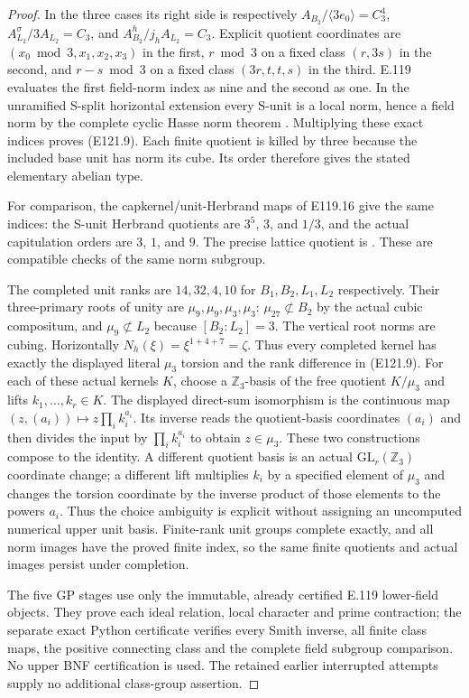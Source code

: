 \begin{proof}
In the three cases its right side is respectively
$A_{B_2}/\langle3e_0\rangle=C_3^4$,
$A_{L_2}^{\sigma}/3A_{L_2}=C_3$,
and $A_{B_2}^{h}/j_hA_{L_2}=C_3$.
Explicit quotient coordinates are
$(x_0\bmod3,x_1,x_2,x_3)$ in the first,
$r\bmod3$ on a fixed class $(r,3s)$ in the second, and
$r-s\bmod3$ on a fixed class $(3r,t,t,s)$ in the third.
E.119 evaluates the first field-norm index as nine and the
second as one. In the unramified S-split horizontal extension
every S-unit is a local norm, hence a field norm by the
complete cyclic Hasse norm theorem
\cite[VIII,Theorem3.1]{E_MilneCFT}.
Multiplying these exact indices proves (E121.9).
Each finite quotient is killed by three because the included
base unit has norm its cube. Its order therefore gives the
stated elementary abelian type.

For comparison, the capkernel/unit-Herbrand maps of E119.16
give the same indices: the S-unit Herbrand quotients are
$3^5$, $3$, and $1/3$, and the actual capitulation orders
are $3$, $1$, and $9$. The precise lattice quotient is
\cite[VII,Proposition3.1]{E_MilneCFT}.
These are compatible checks of the same norm subgroup.

The completed unit ranks are $14,32,4,10$ for
$B_1,B_2,L_1,L_2$ respectively. Their three-primary roots
of unity are $\mu_9,\mu_9,\mu_3,\mu_3$:
$\mu_{27}\not\subset B_2$ by the actual cubic compositum,
and $\mu_9\not\subset L_2$ because $[B_2:L_2]=3$.
The vertical root norms are cubing. Horizontally
$N_h(\xi)=\xi^{1+4+7}=\zeta$.
Thus every completed kernel has exactly the displayed
literal $\mu_3$ torsion and the rank difference in (E121.9).
For each of these actual kernels $K$, choose a $\mathbb Z_3$-basis
of the free quotient $K/\mu_3$ and lifts $k_1,\ldots,k_r\in K$.
The displayed direct-sum isomorphism is the continuous map
$(z,(a_i))\mapsto z\prod_i k_i^{a_i}$.
Its inverse reads the quotient-basis coordinates $(a_i)$ and
then divides the input by $\prod_i k_i^{a_i}$ to obtain
$z\in\mu_3$. These two constructions compose to the identity.
A different quotient basis is an actual $\mathrm{GL}_r(\mathbb Z_3)$
coordinate change; a different lift multiplies $k_i$ by
a specified element of $\mu_3$ and changes the torsion coordinate
by the inverse product of those elements to the powers $a_i$.
Thus the choice ambiguity is explicit without assigning an
uncomputed numerical upper unit basis.
Finite-rank unit groups complete exactly, and all norm
images have the proved finite index, so the same finite
quotients and actual images persist under completion.

The five GP stages use only the immutable, already certified
E.119 lower-field objects. They prove each ideal relation,
local character and prime contraction; the separate exact
Python certificate verifies every Smith inverse, all finite
class maps, the positive connecting class and the complete
field subgroup comparison. No upper BNF certification is
used. The retained earlier interrupted attempts supply no
additional class-group assertion.
\end{proof}
